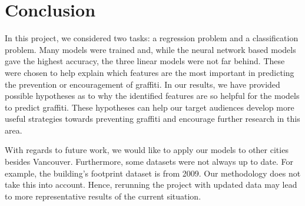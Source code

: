 \chapter{Conclusion}

In this project, we considered two tasks: a regression problem and a classification problem. Many models were trained and, while the neural network based models gave the highest accuracy, the three linear models were not far behind. These were chosen to help explain which features are the most important in predicting the prevention or encouragement of graffiti. In our results, we have provided possible hypotheses as to why the identified features are so helpful for the models to predict graffiti. These hypotheses can help our target audiences develop more useful strategies towards preventing graffiti and encourage further research in this area.

With regards to future work, we would like to apply our models to other cities besides Vancouver. Furthermore, some datasets were not always up to date. For example, the building's footprint dataset is from 2009. Our methodology does not take this into account. Hence, rerunning the project with updated data may lead to more representative results of the current situation.
